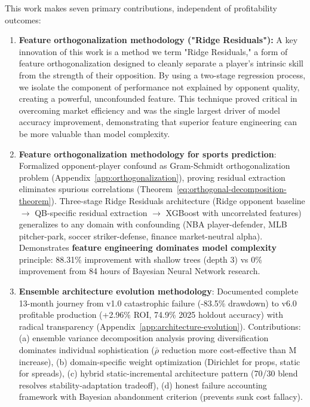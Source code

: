 This work makes seven primary contributions, independent of profitability outcomes:
\begin{enumerate}
  \item \textbf{Feature orthogonalization methodology ("Ridge Residuals"):} A key innovation of this work is a method we term "Ridge Residuals," a form of feature orthogonalization designed to cleanly separate a player's intrinsic skill from the strength of their opposition. By using a two-stage regression process, we isolate the component of performance not explained by opponent quality, creating a powerful, unconfounded feature. This technique proved critical in overcoming market efficiency and was the single largest driver of model accuracy improvement, demonstrating that superior feature engineering can be more valuable than model complexity.

  \item \textbf{Feature orthogonalization methodology for sports prediction}: Formalized opponent-player confound as Gram-Schmidt orthogonalization problem (Appendix~\ref{app:orthogonalization}), proving residual extraction eliminates spurious correlations (Theorem~\ref{eq:orthogonal-decomposition-theorem}). Three-stage Ridge Residuals architecture (Ridge opponent baseline $\to$ QB-specific residual extraction $\to$ XGBoost with uncorrelated features) generalizes to any domain with confounding (NBA player-defender, MLB pitcher-park, soccer striker-defense, finance market-neutral alpha). Demonstrates \textbf{feature engineering dominates model complexity} principle: 88.31\% improvement with shallow trees (depth 3) vs 0\% improvement from 84 hours of Bayesian Neural Network research.

  \item \textbf{Ensemble architecture evolution methodology}: Documented complete 13-month journey from v1.0 catastrophic failure (-83.5\% drawdown) to v6.0 profitable production (+2.96\% ROI, 74.9\% 2025 holdout accuracy) with radical transparency (Appendix~\ref{app:architecture-evolution}). Contributions: (a) ensemble variance decomposition analysis proving diversification dominates individual sophistication ($\bar{\rho}$ reduction more cost-effective than M increase), (b) domain-specific weight optimization (Dirichlet for props, static for spreads), (c) hybrid static-incremental architecture pattern (70/30 blend resolves stability-adaptation tradeoff), (d) honest failure accounting framework with Bayesian abandonment criterion (prevents sunk cost fallacy).


\end{enumerate}
